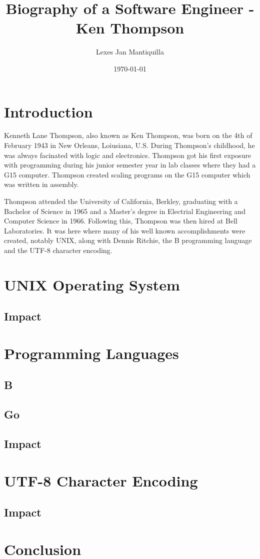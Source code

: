 \documentclass{article}
\title{Biography of a Software Engineer - Ken Thompson}
\author{Lexes Jan Mantiquilla}
\date{\today}
\begin{document}
\maketitle

\section{Introduction}
Kenneth Lane Thompson, also known as Ken Thompson, was born on the 4th of
February 1943 in New Orleans, Loiusiana, U.S. During Thompson's childhood, he
was always facinated with logic and electronics. Thompson got his first
exposure with programming during his junior semester year in lab classes
where they had a G15 computer. Thompson created scaling programs on the G15
computer which was written in assembly. \cite{seibel2009coders}

Thompson attended the University of California, Berkley, graduating with a
Bachelor of Science in 1965 and a Master's degree in Electrial Engineering and
Computer Science in 1966. Following this, Thompson was then hired at Bell
Laboratories. It was here where many of his well known accomplishments were
created, notably UNIX, along with Dennis Ritchie, the B programming language and
the UTF-8 character encoding. \cite{linfo}

\section{UNIX Operating System}
\subsection{Impact}

\section{Programming Languages}
\subsection{B}
\subsection{Go}
\subsection{Impact}

\section{UTF-8 Character Encoding}
\subsection{Impact}

\section{Conclusion}



\end{document}
